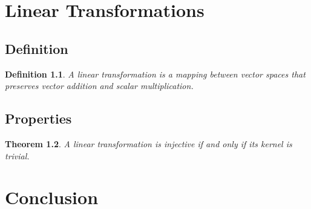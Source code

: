 \documentclass{report}
\newtheorem{mytheorem}{Theorem}[section]
\newtheorem{mydefinition}[mytheorem]{Definition}
\begin{document}
\chapter{Linear Transformations}
\section{Definition}
\begin{mydefinition}
A linear transformation is a mapping between vector spaces that preserves vector addition and scalar multiplication.
\end{mydefinition}

\section{Properties}
\begin{mytheorem}
A linear transformation is injective if and only if its kernel is trivial.
\end{mytheorem}

\chapter{Conclusion}
\lipsum[5-6]
\end{document}
